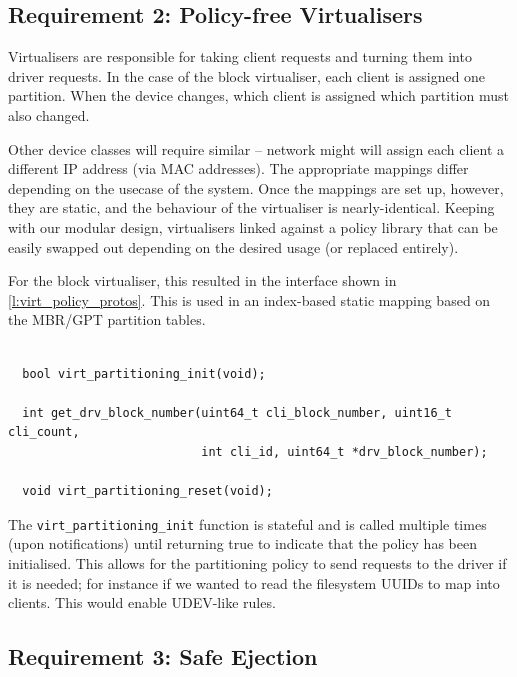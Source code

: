 \documentclass[a4paper,12pt]{report}
\begin{document}
\subsection{Requirement 2: Policy-free Virtualisers}

Virtualisers are responsible for taking client requests and turning them into
driver requests. In the case of the block virtualiser, each client is assigned
one partition. When the device changes, which client is assigned which partition
must also changed.

Other device classes will require similar -- network might will assign each client
a different IP address (via MAC addresses). The appropriate mappings differ
depending on the usecase of the system. Once the mappings are set up, however,
they are static, and the behaviour of the virtualiser is nearly-identical.
Keeping with our modular design, virtualisers linked against a policy library
that can be easily swapped out depending on the desired usage (or replaced
entirely).

For the block virtualiser, this resulted in the interface shown in
\autoref{l:virt_policy_protos}. This is used in an index-based static mapping
based on the MBR/GPT partition tables.

\begin{lstlisting}[gobble=2,firstline=2,float=th,tabsize=2,
  label={l:virt_policy_protos},
  caption={Virtualiser policy interface prototypes. }]

  bool virt_partitioning_init(void);

  int get_drv_block_number(uint64_t cli_block_number, uint16_t cli_count,
                           int cli_id, uint64_t *drv_block_number);

  void virt_partitioning_reset(void);
\end{lstlisting}

The \texttt{virt\_partitioning\_init\(\)} function is stateful and is called
multiple times (upon notifications) until returning true to indicate that the
policy has been initialised. This allows for the partitioning policy to send
requests to the driver if it is needed; for instance if we wanted to read the
filesystem UUIDs to map into clients. This would enable UDEV-like rules.

\subsection{Requirement 3: Safe Ejection}
\end{document}
